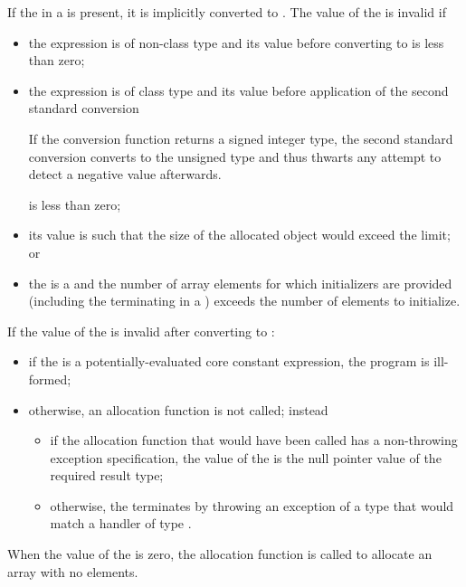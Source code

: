 \pnum
{}%
If the  in a 
is present, it is implicitly converted to .
%
The value of the  is invalid if
\begin{itemize}
\item
the expression is of non-class type and its value before converting to
 is less than zero;

\item
the expression is of class type and its value before application of the second
standard conversion
\begin{footnote}
If the conversion function
returns a signed integer type, the second standard conversion converts to the
unsigned type  and thus thwarts any attempt to detect a
negative value afterwards.
\end{footnote}
is less than zero;

\item
its value is such that the size of the allocated object would exceed the
 limit; or

\item
the  is a  and the
number of array elements for which initializers are provided (including the
terminating  in a ) exceeds the
number of elements to initialize.
\end{itemize}

If the value of the  is invalid after converting to :
\begin{itemize}
\item
if the  is a potentially-evaluated core constant expression,
the program is ill-formed;
\item
otherwise, an allocation function is not called; instead
\begin{itemize}
\item
if the allocation function that would have been called
has a non-throwing exception specification,
the value of the 
is the null pointer value of the required result type;
\item
otherwise, the  terminates by throwing an
exception of a type that would match a handler of type
.
\end{itemize}
\end{itemize}
When the value of the  is zero, the allocation
function is called to allocate an array with no elements.

